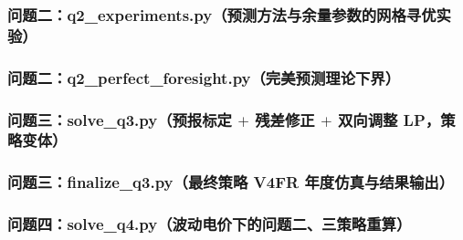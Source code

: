 \subsubsection{问题二：q2\_experiments.py（预测方法与余量参数的网格寻优实验）}


\subsubsection{问题二：q2\_perfect\_foresight.py（完美预测理论下界）}


\subsubsection{问题三：solve\_q3.py（预报标定 $+$ 残差修正 $+$ 双向调整 LP，策略变体）}


\subsubsection{问题三：finalize\_q3.py（最终策略 V4FR 年度仿真与结果输出）}


\subsubsection{问题四：solve\_q4.py（波动电价下的问题二、三策略重算）}

